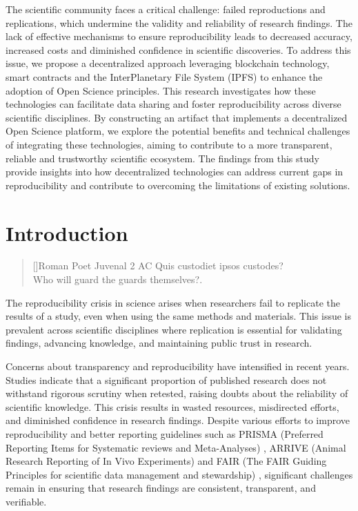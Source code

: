 \documentclass[final]{rc-book-2.14}
\begin{document}
\drop  The scientific community faces a critical challenge: failed reproductions and replications, which undermine the validity and reliability of research findings. The lack of effective mechanisms to ensure reproducibility leads to decreased accuracy, increased costs and diminished confidence in scientific discoveries. To address this issue, we propose a decentralized approach leveraging blockchain technology, smart contracts and the  InterPlanetary File System (IPFS) to enhance the adoption of Open Science principles. This research investigates how these technologies can facilitate data sharing and foster reproducibility across diverse scientific disciplines. By constructing an artifact that implements a decentralized Open Science platform, we explore the potential benefits and technical challenges of integrating these technologies, aiming to contribute to a more transparent, reliable and trustworthy scientific ecosystem. The findings from this study provide insights into how decentralized technologies can address current gaps in reproducibility and contribute to overcoming the limitations of existing solutions.

\mainmatter


\chapter{Introduction}
\label{chp:introduction}

\begin{quotation}[]{Roman Poet Juvenal  2 AC}
    Quis custodiet ipsos custodes? \\ Who will guard the guards themselves?.
\end{quotation}


\drop



The reproducibility crisis in science arises when researchers fail to replicate the results of a study, even when using the same methods and materials. This issue is prevalent across scientific disciplines where replication is essential for validating findings, advancing knowledge, and maintaining public trust in research.

Concerns about transparency and reproducibility have intensified in recent years. Studies indicate that a significant proportion of published research does not withstand rigorous scrutiny when retested, raising doubts about the reliability of scientific knowledge. This crisis results in wasted resources, misdirected efforts, and diminished confidence in research findings. Despite various efforts to improve reproducibility and better reporting guidelines such as PRISMA (Preferred Reporting Items for Systematic reviews and Meta-Analyses) \cite{Pagen71}, ARRIVE (Animal Research Reporting of In Vivo Experiments) \cite{percie2020arrive} and FAIR (The FAIR Guiding Principles for scientific data management and stewardship) \cite{wilkinson2016fair}, significant challenges remain in ensuring that research findings are consistent, transparent, and verifiable.
\end{document}
